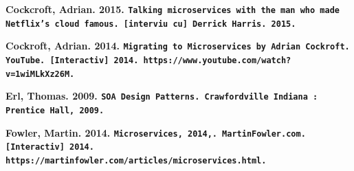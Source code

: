 \documentclass[12pt]{report}
\begin{document}
\begin{flushleft}
\textbf{Cockcroft, Adrian. 2015. \texttt{Talking microservices with the man who made Netflix’s cloud famous. [interviu cu] Derrick Harris. 2015.}}
\end{flushleft}

\begin{flushleft}
\textbf{
Cockroft, Adrian. 2014. \texttt{Migrating to Microservices by Adrian Cockroft. YouTube. [Interactiv] 2014. https://www.youtube.com/watch?v=1wiMLkXz26M.}}
\end{flushleft}

\begin{flushleft}
\textbf{
Erl, Thomas. 2009. \texttt{SOA Design Patterns. Crawfordville Indiana : Prentice Hall, 2009.}}
\end{flushleft}

\begin{flushleft}
\textbf{
Fowler, Martin. 2014. \texttt{Microservices, 2014,. MartinFowler.com. [Interactiv] 2014. https://martinfowler.com/articles/microservices.html.}}
\end{flushleft}
\end{document}
